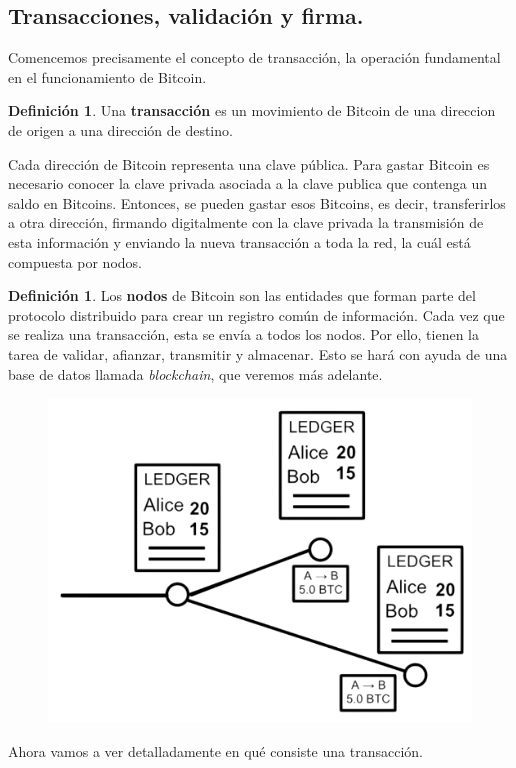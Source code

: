 \documentclass[twoside]{article}
\theoremstyle{definition}
\newtheorem{defi}[teorema]{Definición}
\begin{document}
\subsection{Transacciones, validación y firma.}
Comencemos precisamente el concepto de transacción, la operación fundamental en el funcionamiento de Bitcoin. 
\begin{defi} Una \textbf{transacción} es un movimiento de Bitcoin de una direccion de origen a una dirección de destino. 
\end{defi}
Cada dirección de Bitcoin representa una clave pública. Para gastar Bitcoin es necesario conocer la clave privada asociada a la clave publica que contenga un saldo en Bitcoins. Entonces, se pueden gastar esos Bitcoins, es decir, transferirlos a otra dirección, firmando digitalmente con la clave privada la transmisión de esta información y enviando la nueva transacción a toda la red, la cuál está compuesta por nodos.
\begin{defi}
Los \textbf{nodos} de Bitcoin son las entidades que forman parte del protocolo distribuido para crear un registro común de información. Cada vez que se realiza una transacción, esta se envía a todos los nodos. Por ello, tienen la tarea de validar, afianzar, transmitir y almacenar. Esto se hará con ayuda de una base de datos llamada \emph{blockchain}, que veremos más adelante.
\end{defi}
\begin{figure}[h!]
\includegraphics[scale=0.45]{transaction}
\end{figure}
Ahora vamos a ver detalladamente en qué consiste una transacción. 
\end{document}
